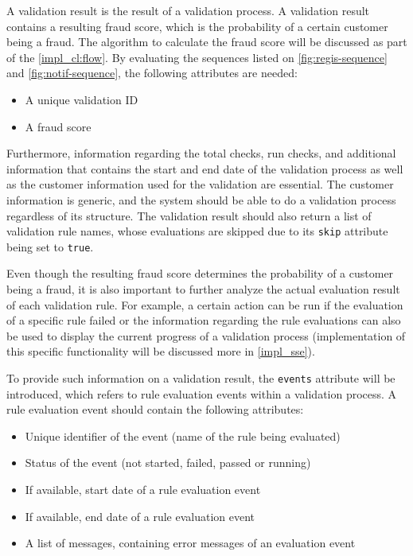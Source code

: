     A validation result is the result of a validation process. A validation result contains a resulting fraud score, which is the probability of a certain customer being a fraud. The algorithm to calculate the fraud score will be discussed as part of the \autoref{impl_cl:flow}.
    By evaluating the sequences listed on \autoref{fig:regis-sequence} and \autoref{fig:notif-sequence}, the following attributes are needed:

    \begin{itemize}
      \item A unique validation ID
      \item A fraud score 
    \end{itemize}

    Furthermore, information regarding the total checks, run checks, and additional information that contains the start and end date of the validation process as well as the customer information used for the validation are essential. The customer information is generic, and the system should be able to do a validation process regardless of its structure. The validation result should also return a list of validation rule names, whose evaluations are skipped due to its \verb;skip; attribute being set to \verb;true;.

    Even though the resulting fraud score determines the probability of a customer being a fraud, it is also important to further analyze the actual evaluation result of each validation rule. For example, a certain action can be run if the evaluation of a specific rule failed or the information regarding the rule evaluations can also be used to display the current progress of a validation process (implementation of this specific functionality will be discussed more in \autoref{impl_sse}). 

    To provide such information on a validation result, the \verb;events; attribute will be introduced, which refers to rule evaluation events within a validation process. A rule evaluation event should contain the following attributes:

    \begin{itemize}
      \item Unique identifier of the event (name of the rule being evaluated)
      \item Status of the event (not started, failed, passed or running) 
      \item If available, start date of a rule evaluation event 
      \item If available, end date of a rule evaluation event 
      \item A list of messages, containing error messages of an evaluation event
    \end{itemize}

